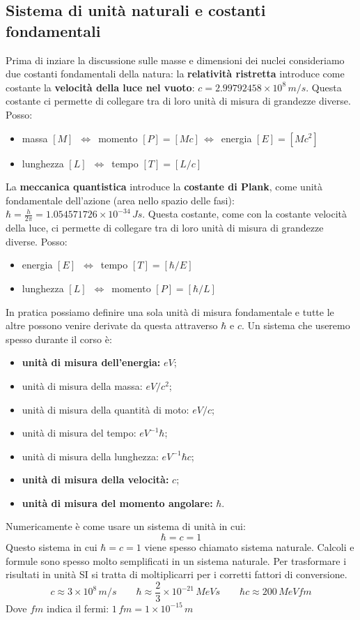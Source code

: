 \subsection{Sistema di unità naturali e costanti fondamentali}
Prima di inziare la discussione sulle masse e dimensioni dei nuclei consideriamo due costanti fondamentali della natura: la \textbf{relatività ristretta} introduce come costante la \textbf{velocità della luce nel vuoto}: $c=2.99792458\times10^8\,m/s$. Questa costante ci permette di collegare tra di loro unità di misura di grandezze diverse. Posso:
\begin{itemize}
    \item massa $[M]$ $\,\Leftrightarrow\,$ momento $[P]=[Mc]\,\Leftrightarrow\,$ energia $[E]=[Mc^2]$
    \item lunghezza $[L]$ $\,\Leftrightarrow\,$ tempo $[T]=[L/c]$
\end{itemize}
La \textbf{meccanica quantistica} introduce la \textbf{costante di Plank}, come unità fondamentale dell'azione (area nello spazio delle fasi): $\hbar=\frac{h}{2\pi}=1.054571726\times10^{-34}\,Js$. Questa costante, come con la costante velocità della luce, ci permette di collegare tra di loro unità di misura di grandezze diverse. Posso:
\begin{itemize}
    \item energia $[E]$ $\,\Leftrightarrow\,$ tempo $[T]=[\hbar/E]$
    \item lunghezza $[L]$ $\,\Leftrightarrow\,$ momento $[P]=[\hbar/L]$
\end{itemize}
In pratica possiamo definire una sola unità di misura fondamentale e tutte le altre possono venire derivate da questa attraverso $\hbar$ e $c$. Un sistema che useremo spesso durante il corso è: 
\begin{itemize}
    \item \textbf{unità di misura dell'energia:} $eV$;
    \item unità di misura della massa: $eV/c^2$;
    \item unità di misura della quantità di moto: $eV/c$;
    \item unità di misura del tempo: $eV^{-1}\hbar$;
    \item unità di misura della lunghezza: $eV^{-1}\hbar c$;
    \item \textbf{unità di misura della velocità:} $c$;
    \item \textbf{unità di misura del momento angolare:} $\hbar$.
\end{itemize}
Numericamente è come usare un sistema di unità in cui:
\begin{equation*}
    \hbar=c=1
\end{equation*}
Questo sistema in cui $\hbar=c=1$ viene spesso chiamato sistema naturale. Calcoli e formule sono spesso molto semplificati in un sistema naturale. Per trasformare i risultati in unità SI si tratta di moltiplicarri per i corretti fattori di conversione.
\begin{equation*}
    c\approx 3\times10^{8}\,m/s \qquad \hbar \approx \frac{2}{3}\times10^{-21}\,MeVs \qquad \hbar c \approx 200\, MeVfm
\end{equation*}
Dove $fm$ indica il fermi: $1\,fm=1\times 10^{-15}\,m$
